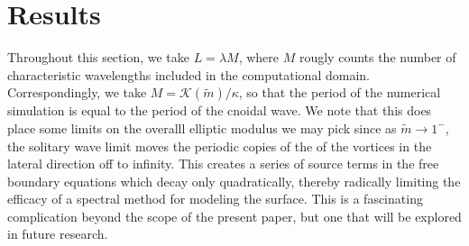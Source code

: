 \documentclass[a4paper,11pt]{article}
\begin{document}
\section*{Results}
Throughout this section, we take $L = \lambda M$, where $M$ rougly counts the number of characteristic wavelengths included in the computational domain.   Correspondingly, we take $M=\mathcal{K}(\tilde{m})/\kappa$, so that the period of the numerical simulation is equal to the period of the cnoidal wave.   We note that this does place some limits on the overalll elliptic modulus we may pick since as $\tilde{m}\rightarrow 1^{-}$, the solitary wave limit moves the periodic copies of the of the vortices in the lateral direction off to infinity.  This creates a series of source terms in the free boundary equations which decay only quadratically, thereby radically limiting the efficacy of a spectral method for modeling the surface.  This is a fascinating complication beyond the scope of the present paper, but one that will be explored in future research.  
\end{document}
